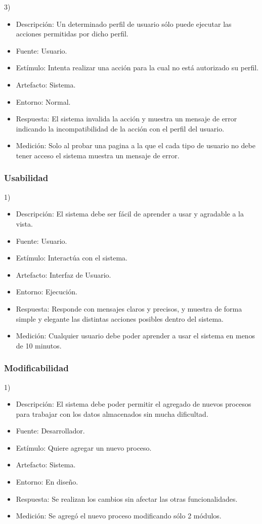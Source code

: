 \documentclass{article}
\theoremstyle{definition}
\theoremstyle{remark}
\begin{document}
3)
\begin{itemize}
  \item Descripción: Un determinado perfil de usuario sólo puede ejecutar las acciones permitidas por dicho perfil.
  \item Fuente: Usuario. %
  \item Estímulo: Intenta realizar una acción para la cual no está autorizado su perfil.
  \item Artefacto: Sistema.
  \item Entorno: Normal.
  \item Respuesta: El sistema invalida la acción y muestra un mensaje de error indicando la incompatibilidad de la acción con el perfil del usuario.
  \item Medición: Solo al probar una pagina a la que el cada tipo de usuario no debe tener acceso el sistema muestra un mensaje de error.
\end{itemize}

\subsubsection{Usabilidad}
1)
\begin{itemize}
  \item Descripción: El sistema debe ser fácil de aprender a usar y agradable a la vista.
  \item Fuente: Usuario.
  \item Estímulo: Interactúa con el sistema.
  \item Artefacto: Interfaz de Usuario.
  \item Entorno: Ejecución.
  \item Respuesta: Responde con mensajes claros y precisos, y muestra de forma simple y elegante las distintas acciones posibles dentro del sistema.
  \item Medición: Cualquier usuario debe poder aprender a usar el sistema en menos de 10 minutos.
\end{itemize}

\subsubsection{Modificabilidad}
1)
\begin{itemize}
  \item Descripción: El sistema debe poder permitir el agregado de nuevos procesos para trabajar con los datos almacenados sin mucha dificultad.
  \item Fuente: Desarrollador.
  \item Estímulo: Quiere agregar un nuevo proceso.
  \item Artefacto: Sistema.
  \item Entorno: En diseño.
  \item Respuesta: Se realizan los cambios sin afectar las otras funcionalidades.
  \item Medición: Se agregó el nuevo proceso modificando sólo 2 módulos.
\end{itemize}
\end{document}
